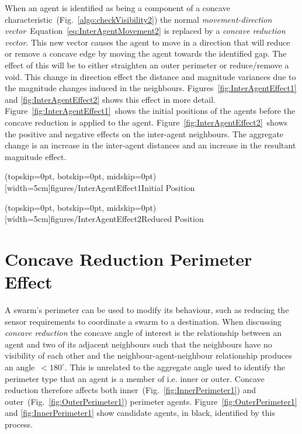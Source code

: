 \documentclass{ieeeaccess}
\begin{document}
When an agent is identified as being a component of a concave characteristic~(Fig.~\ref{algo:checkVisibility2}) the normal \textit{movement-direction vector}~Equation~\ref{eq:InterAgentMovement2} is replaced by a \textit{concave reduction vector}. This new vector causes the agent to move in a direction that will reduce or remove a concave edge by moving the agent towards the identified gap. The effect of this will be to either straighten an outer perimeter or reduce/remove a void. This change in direction effect the distance and magnitude variances due to the magnitude changes induced in the neighbours. Figures~\ref{fig:InterAgentEffect1} and \ref{fig:InterAgentEffect2} shows this effect in more detail. Figure~\ref{fig:InterAgentEffect1}~shows the initial positions of the agents before the concave reduction is applied to the agent. Figure~\ref{fig:InterAgentEffect2}~shows the positive and negative effects on the inter-agent neighbours. The aggregate change is an increase in the inter-agent distances and an increase in the resultant magnitude effect.

\Figure[t!](topskip=0pt, botskip=0pt, midskip=0pt)[width=5cm]{figures/InterAgentEffect1}{Initial Position\label{fig:InterAgentEffect1}}

\Figure[t!](topskip=0pt, botskip=0pt, midskip=0pt)[width=5cm]{figures/InterAgentEffect2}{Reduced Position\label{fig:InterAgentEffect2}}

\section{Concave Reduction Perimeter Effect}\label{sec:ConcaveReductionPerimeterEffect}
A swarm's perimeter can be used to modify its behaviour, such as reducing the sensor requirements to coordinate a swarm to a destination. When discussing \textit{concave reduction} the concave angle of interest is the relationship between an agent and two of its adjacent neighbours such that the neighbours have no visibility of each other and the neighbour-agent-neighbour relationship produces an angle~$< 180^\circ$. This is unrelated to the aggregate angle used to identify the perimeter type that an agent is a member of i.e. inner or outer. Concave reduction therefore affects both inner~(Fig.~\ref{fig:InnerPerimeter1}) and outer~(Fig.~\ref{fig:OuterPerimeter1}) perimeter agents. Figure~\ref{fig:OuterPerimeter1} and \ref{fig:InnerPerimeter1} show candidate agents, in black, identified by this process. 
\end{document}
